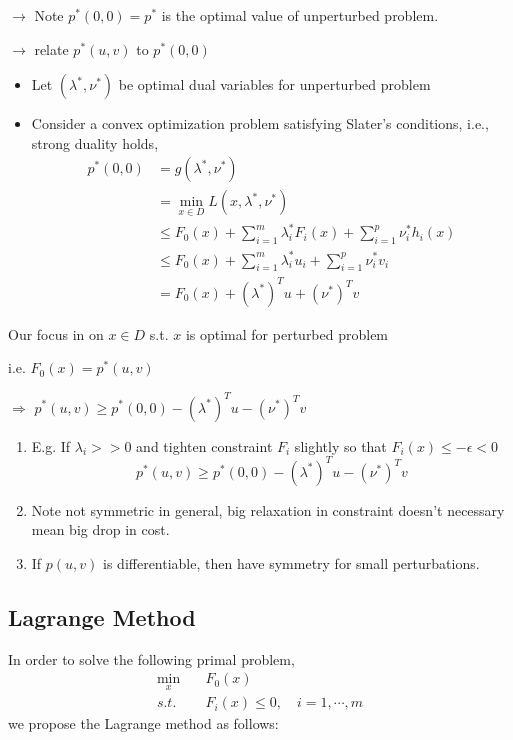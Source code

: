 $\rightarrow$ Note $p^*(0,0) = p^*$ is the optimal value of unperturbed problem.

$\rightarrow$ relate $p^*(u,v)$ to $p^*(0,0)$\\

\begin{itemize}
	\item Let $(\lambda^*, \nu^*)$ be optimal dual variables for unperturbed problem
	
	\item Consider a convex optimization problem satisfying Slater's conditions, i.e., strong duality holds,
	\begin{align*}
		p^*(0,0) &= g(\lambda^*, \nu^*)\\
		&= \min_{x\in D} L(x, \lambda^*, \nu^*)\\
		&\leq F_0(x) + \sum^m_{i=1}\lambda_i^* F_i(x) + \sum^p_{i=1}\nu_i^* h_i(x)\\
		&\leq F_0(x) + \sum^m_{i=1}\lambda_i^* u_i + \sum^p_{i=1}\nu^*_iv_i\\
		&= F_0(x) + (\lambda^*)^Tu+(\nu^*)^Tv
	\end{align*}
\end{itemize}
Our focus in on $x\in D$ s.t. $x$ is optimal for perturbed problem

i.e. $F_0(x)=p^*(u,v)$

$\Rightarrow$ $p^*(u,v) \geq p^*(0,0) - (\lambda^*)^Tu - (\nu^*)^Tv$

\begin{enumerate}
	\item E.g. If $\lambda_i >> 0$ and tighten constraint $F_i$ slightly so that $F_i(x)\leq -\epsilon < 0$
	$$p^*(u,v)\geq p^*(0,0) - (\lambda^*)^Tu - (\nu^*)^Tv$$
	
	\item Note not symmetric in general, big relaxation in constraint doesn't necessary mean big drop in cost.
	
	\item If $p(u,v)$ is differentiable, then have symmetry for small perturbations. 
\end{enumerate}

\subsection{Lagrange Method}
In order to solve the following primal problem,
\begin{align*}
	\min_x &\quad F_0(x)\\
	s.t. &\quad F_i(x) \leq 0,\quad i = 1,\cdots,m
\end{align*}
we propose the Lagrange method as follows:

